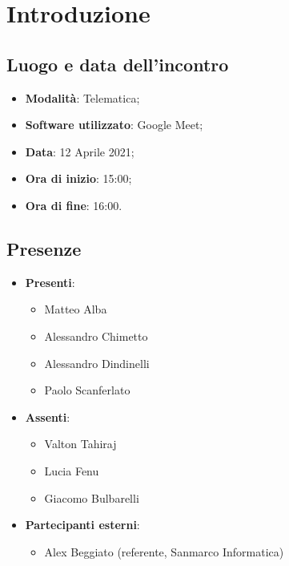 \documentclass[]{article}
\begin{document}
	

	\newpage


	\section{Introduzione}
	\subsection{Luogo e data dell'incontro}
	\begin{itemize}
		\item \textbf{Modalità}: Telematica;
		\item \textbf{Software utilizzato}: Google Meet;
		\item \textbf{Data}: 12 Aprile 2021;
		\item \textbf{Ora di inizio}: 15:00;
		\item \textbf{Ora di fine}: 16:00.
	\end{itemize}

	\subsection{Presenze}
	\begin{itemize}
		\item \textbf{Presenti}:
		\begin{itemize}
			\item Matteo Alba			
			\item Alessandro Chimetto
			\item Alessandro Dindinelli
			\item Paolo Scanferlato

		\end{itemize}
		\item \textbf{Assenti}:
		\begin{itemize}
			\item Valton Tahiraj
			\item Lucia Fenu
			\item Giacomo Bulbarelli

		\end{itemize}
		\item \textbf{Partecipanti esterni}:
		\begin{itemize}
			\item Alex Beggiato (referente, Sanmarco Informatica)
		\end{itemize}
	\end{itemize}
\end{document}
